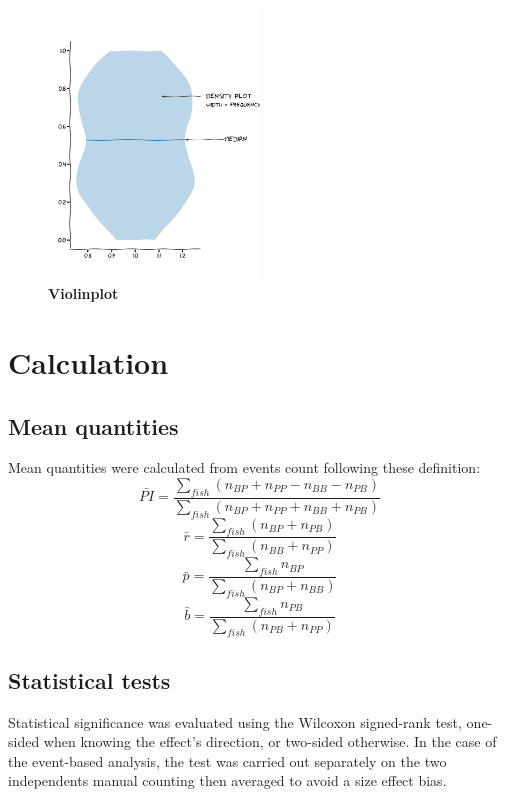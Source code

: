 \begin{appendices}
      \begin{figure}[h]
        \centering
        \includegraphics[width=0.5\textwidth]{part_2/assets/violinplot.png}
        \caption{\textbf{Violinplot}}
        \label{violinplot}
      \end{figure}

  \chapter{Calculation}

    \section{Mean quantities}
    Mean quantities were calculated from events count following these definition:
    $$
    \bar{PI} = \frac{\sum_{fish}^{}(n_{BP} + n_{PP} - n_{BB} - n_{PB})}{\sum_{fish}^{}(n_{BP} + n_{PP} + n_{BB} + n_{PB})}
    $$
    $$
    \bar{r} =\frac{\sum_{fish}^{}(n_{BP} + n_{PB})}{\sum_{fish}^{}(n_{BB} + n_{PP})}
    $$
    $$
    \bar{p} = \frac{\sum_{fish}^{}n_{BP}}{\sum_{fish}^{}(n_{BP} + n_{BB})}
    $$
    $$
    \bar{b} = \frac{\sum_{fish}^{}n_{PB}}{\sum_{fish}^{}(n_{PB} + n_{PP})}
    $$

    \section{Statistical tests}
    Statistical significance was evaluated using the Wilcoxon signed-rank test, one-sided when knowing the effect's direction, or two-sided otherwise. In the case of the event-based analysis, the test was carried out separately on the two independents manual counting then averaged to avoid a size effect bias.


\end{appendices}
